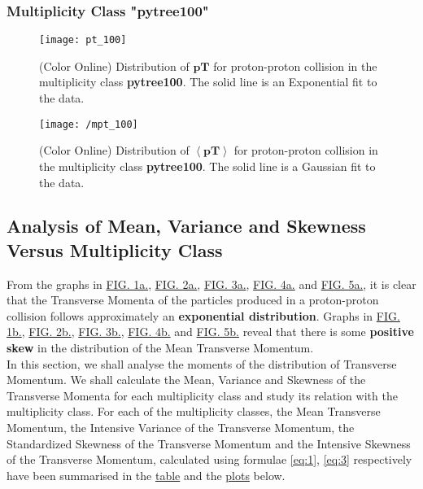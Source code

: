 \documentclass[letterpaper,aps,prc,superscriptaddress,nofootinbib,10pt,showpacs,floatfix]{revtex4-2}%
\begin{document}
\FloatBarrier
\vspace{-3mm}

\subsubsection{Multiplicity Class "pytree100"}
\label{subsubsec:100}
\vspace{-5mm}
\begin{figure}[!htb]
   \begin{minipage}{0.48\textwidth}
   \label{Fig:5a}
   \label{Fig:5b}
     \centering
     \renewcommand{\thefigure}{5a}
     \texttt{[image: pt\_100]}
     \caption{(Color Online) Distribution of $\mathbf{pT}$ for proton-proton collision in the multiplicity class \textbf{pytree100}. The solid line is an Exponential fit to the data.}
   \end{minipage}\hfill
   \begin{minipage}{0.48\textwidth}
     \centering
     \renewcommand{\thefigure}{5b}
     \texttt{[image: /mpt\_100]}
     \caption{(Color Online) Distribution of $\mathbf{\left<pT\right>}$ for proton-proton collision in the multiplicity class \textbf{pytree100}. The solid line is a Gaussian fit to the data.}
   \end{minipage}
\end{figure}

\FloatBarrier

\subsection{Analysis of Mean, Variance and Skewness Versus Multiplicity Class}
From the graphs in \hyperref[Fig:1a]{FIG. 1a.}, \hyperref[Fig:2a]{FIG. 2a.}, \hyperref[Fig:3a]{FIG. 3a.}, \hyperref[Fig:4a]{FIG. 4a.} and \hyperref[Fig:5a]{FIG. 5a.}, it is clear that the Transverse Momenta of the particles produced in a proton-proton collision follows approximately an \textbf{exponential distribution}. Graphs in \hyperref[Fig:1b]{FIG. 1b.}, \hyperref[Fig:2b]{FIG. 2b.}, \hyperref[Fig:3b]{FIG. 3b.}, \hyperref[Fig:4b]{FIG. 4b.} and \hyperref[Fig:5b]{FIG. 5b.} reveal that there is some \textbf{positive skew} in the distribution of the Mean Transverse Momentum.
\\
In this section, we shall analyse the moments of the distribution of Transverse Momentum. We shall calculate the Mean, Variance and Skewness of the Transverse Momenta for each multiplicity class and study its relation with the multiplicity class. For each of the multiplicity classes, the Mean Transverse Momentum, the Intensive Variance of the Transverse Momentum, the Standardized Skewness of the Transverse Momentum and the Intensive Skewness of the Transverse Momentum, calculated using formulae \ref{eq:1}, \ref{eq:3} respectively have been summarised in the \hyperref[subsubsec:summary]{table} and the \hyperref[subsubsec:mean]{plots} below.
\end{document}

